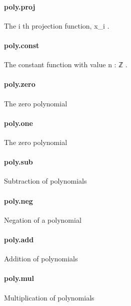 \documentclass{article}
\begin{document}
\paragraph{poly.proj}
\par
The 
\colorbox[RGB]{253,246,227}{{{{\color[RGB]{101, 123, 131} i }}}}th projection function, 
\colorbox[RGB]{253,246,227}{{{{\color[RGB]{101, 123, 131} x\_i }}}}.
\paragraph{poly.const}
\par
The constant function with value 
\colorbox[RGB]{253,246,227}{{{{\color[RGB]{101, 123, 131} n : ℤ }}}}.
\paragraph{poly.zero}
\par
The zero polynomial
\paragraph{poly.one}
\par
The zero polynomial
\paragraph{poly.sub}
\par
Subtraction of polynomials
\paragraph{poly.neg}
\par
Negation of a polynomial
\paragraph{poly.add}
\par
Addition of polynomials
\paragraph{poly.mul}
\par
Multiplication of polynomials
\end{document}
